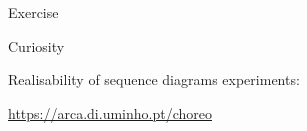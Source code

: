\documentclass[aspectratio=169]{beamer}
\begin{document}
\begin{slide}{Exercise}
\end{slide}

\begin{slide}{Curiosity}
  
  \Large

  \begin{block}{Realisability of sequence diagrams experiments: }
    \begin{center}
      \url{https://arca.di.uminho.pt/choreo}      
    \end{center}
  \end{block}
\end{slide}







\end{document}
